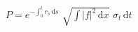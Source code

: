 \documentclass{article}
\begin{document}
$P=e^{-\int_0^t r_s\,\mathrm ds}$ $\sqrt{\int|f|^2\,\mathrm dx}$ $\sigma_t\,\mathrm dt$
\end{document}
